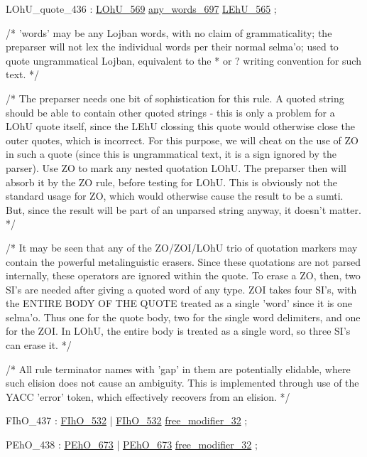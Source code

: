 \label{html:y436}
LOhU_quote_436          :  \hyperref[html:y569]{LOhU_569}  \hyperref[html:y697]{any_words_697}  \hyperref[html:y565]{LEhU_565}
                        ;

/* 'words' may be any Lojban words, with no claim of grammaticality; the
   preparser will not lex the individual words per their normal selma'o;
   used to quote ungrammatical Lojban, equivalent to the * or ? writing
   convention for such text.  */

/* The preparser needs one bit of sophistication for this rule.  A
   quoted string should be able to contain other quoted strings - this is
   only a problem for a LOhU quote itself, since the LEhU clossing this
   quote would otherwise close the outer quotes, which is incorrect.  For
   this purpose, we will cheat on the use of ZO in such a quote (since this
   is ungrammatical text, it is a sign ignored by the parser).  Use ZO to
   mark any nested quotation LOhU.  The preparser then will absorb it by
   the ZO rule, before testing for LOhU.  This is obviously not the
   standard usage for ZO, which would otherwise cause the result to be a
   sumti.  But, since the result will be part of an unparsed string anyway,
   it doesn't matter.  */

/* It may be seen that any of the ZO/ZOI/LOhU trio of quotation markers
   may contain the powerful metalinguistic erasers.  Since these quotations
   are not parsed internally, these operators are ignored within the quote.
   To erase a ZO, then, two SI's are needed after giving a quoted word of
   any type.  ZOI takes four SI's, with the ENTIRE BODY OF THE QUOTE
   treated as a single 'word' since it is one selma'o.  Thus one for the
   quote body, two for the single word delimiters, and one for the ZOI.  In
   LOhU, the entire body is treated as a single word, so three SI's can
   erase it.  */

/* All rule terminator names with 'gap' in them are potentially
   elidable, where such elision does not cause an ambiguity.  This is
   implemented through use of the YACC 'error' token, which effectively
   recovers from an elision.  */

\label{html:y437}
FIhO_437                :  \hyperref[html:y532]{FIhO_532}
                        |  \hyperref[html:y532]{FIhO_532}  \hyperref[html:y32]{free_modifier_32}
                        ;

\label{html:y438}
PEhO_438                :  \hyperref[html:y673]{PEhO_673}
                        |  \hyperref[html:y673]{PEhO_673}  \hyperref[html:y32]{free_modifier_32}
                        ;

